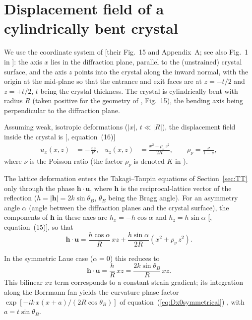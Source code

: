 \documentclass[preprint]{iucr}              %
\begin{document}
\appendix

\section{Displacement field of a cylindrically bent crystal}
\label{app:bent}

We use the coordinate system of \cite{Nesterets2008} [their Fig.~15 and Appendix~A; see also Fig.~1 in \cite{GuigayFerrero2016}]: the axis $x$ lies in the diffraction plane, parallel to the (unstrained) crystal surface, and the axis $z$ points into the crystal along the inward normal, with the origin at the mid-plane so that the entrance and exit faces are at $z=-t/2$ and $z=+t/2$, $t$ being the crystal thickness. The crystal is cylindrically bent with radius $R$ (taken positive for the geometry of \cite{Nesterets2008}, Fig.~15), the bending axis being perpendicular to the diffraction plane.

Assuming weak, isotropic deformations ($|x|,\,t \ll |R|$), the displacement field inside the crystal is [\cite{Nesterets2008}, equation~(16)]
\begin{align}
u_{x}(x,z) &= -\frac{xz}{R}, &
u_{z}(x,z) &= \frac{x^{2}+\rho_\nu\, z^{2}}{2R},
\qquad \rho_\nu=\frac{\nu}{1-\nu},
\end{align}
where $\nu$ is the Poisson ratio (the factor $\rho_\nu$ is denoted $K$ in \cite{Nesterets2008}).

The lattice deformation enters the Takagi--Taupin equations of Section~\ref{sec:TT} only through the phase $\mathbf{h}\cdot\mathbf{u}$, where $\mathbf{h}$ is the reciprocal-lattice vector of the reflection ($h=|\mathbf{h}|=2k\sin\theta_{B}$, $\theta_{B}$ being the Bragg angle). For an asymmetry angle $\alpha$ (angle between the diffraction planes and the crystal surface), the components of $\mathbf{h}$ in these axes are $h_{x}=-h\cos\alpha$ and $h_{z}=h\sin\alpha$ [\cite{GuigayFerrero2016}, equation~(15)], so that
\begin{equation}
\mathbf{h}\cdot\mathbf{u}
= \frac{h\cos\alpha}{R}\,xz
+ \frac{h\sin\alpha}{2R}\left(x^{2}+\rho_\nu\, z^{2}\right).
\end{equation}

In the symmetric Laue case ($\alpha=0$) this reduces to
\begin{equation}
\mathbf{h}\cdot\mathbf{u}
= \frac{h}{R}\,xz
= \frac{2k\sin\theta_{B}}{R}\,xz .
\end{equation}
This bilinear $xz$ term corresponds to a constant strain gradient; its integration along the Borrmann fan yields the curvature phase factor $\exp[-i k\,x(x+a)/(2R\cos\theta_{B})]$ of equation~(\ref{eq:Dx0symmetrical}) \cite{GuigayFerrero2013}, with $a=t\sin\theta_{B}$.
\end{document}
